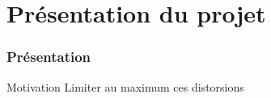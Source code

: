\section{Présentation du projet}
	\begin{frame}
		\frametitle{Présentation}
		\begin{block}{Motivation}
			Limiter au maximum ces distorsions
		\end{block}	
\end{frame}